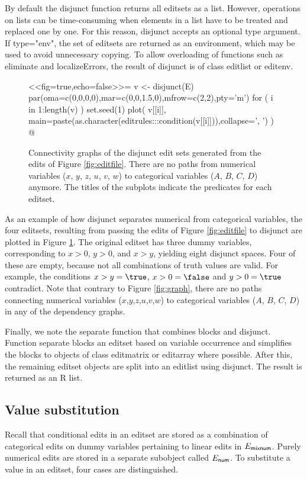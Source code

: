 \documentclass[11pt,fleqn,a4paper]{article}
\begin{document}
By default the {\sf disjunct} function returns all {\sf editset}s as a {\sf
list}. However, operations on lists can be time-consuming when elements in a
list have to be treated and replaced one by one. For this reason, {\sf
disjunct} accepts an optional {\sf type} argument.  If {\sf type="env"}, the
set of {\sf editsets} are returned as an environment, which may be used to
avoid unnecessary copying. To allow overloading of functions such as {\sf
eliminate} and {\sf localizeErrors}, the result of {\sf disjunct} is of class
{\sf editlist} or {\sf editenv}. 

\begin{figure}
<<fig=true,echo=false>>=
v <- disjunct(E)
par(oma=c(0,0,0,0),mar=c(0,0,1.5,0),mfrow=c(2,2),pty='m')
for ( i in 1:length(v) ){
    set.seed(1)
    plot(
        v[[i]],
        main=paste(as.character(editrules:::condition(v[[i]])),collapse=', ')
    )
}
@
\caption{Connectivity graphs of the disjunct edit sets
generated from the edits of Figure \ref{fig:editfile}. There are no paths from
numerical variables ($x$, $y$, $z$, $u$, $v$, $w$) to categorical 
variables ($A$, $B$, $C$, $D$) anymore. The titles of the subplots indicate
the predicates for each {\sf editset}.}
\label{figdisjunct}
\end{figure}
%
%
As an example of how {\sf disjunct} separates numerical from categorical
variables, the four editsets, resulting from passing the edits of Figure
\ref{fig:editfile} to {\sf disjunct} are plotted in Figure \ref{figdisjunct}.
The original editset has three dummy variables, corresponding to $x>0$, $y>0$,
and $x>y$, yielding eight disjunct spaces. Four of these are empty, because not
all combinations of truth values are valid. For example, the conditions
$x>y=\true$, $x>0=\false$ and $y>0=\true$ contradict.  Note that contrary to
Figure \ref{fig:graph}, there are no paths connecting numerical variables
($x$,$y$,$z$,$u$,$v$,$w$) to categorical variables ($A$, $B$, $C$, $D$) in any
of the dependency graphs.

Finally, we note the {\sf separate} function that combines {\sf blocks} and
{\sf disjunct}. Function {\sf separate} blocks an editset based on variable
occurrence and simplifies the blocks to objects of class {\sf editmatrix} or
{\sf editarray} where possible. After this, the remaining {\sf editset} objects
are split into an {\sf editlist} using {\sf disjunct}. The result is returned
as an {\sf R} {\sf list}. 

\subsection{Value substitution}
Recall that conditional edits in an {\sf editset} are stored as a combination of
categorical edits on dummy variables pertaining to linear edits in $E_{\sf mixnum}$.
Purely numerical edits are stored in a separate subobject called $E_{\sf num}$.
To substitute a value in an {\sf editset}, four cases are distinguished.
\end{document}
